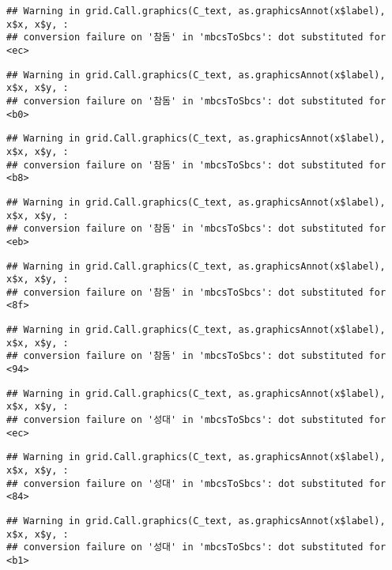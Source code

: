 \documentclass[
]{article}
\begin{document}
\begin{verbatim}
## Warning in grid.Call.graphics(C_text, as.graphicsAnnot(x$label), x$x, x$y, :
## conversion failure on '참돔' in 'mbcsToSbcs': dot substituted for <ec>
\end{verbatim}

\begin{verbatim}
## Warning in grid.Call.graphics(C_text, as.graphicsAnnot(x$label), x$x, x$y, :
## conversion failure on '참돔' in 'mbcsToSbcs': dot substituted for <b0>
\end{verbatim}

\begin{verbatim}
## Warning in grid.Call.graphics(C_text, as.graphicsAnnot(x$label), x$x, x$y, :
## conversion failure on '참돔' in 'mbcsToSbcs': dot substituted for <b8>
\end{verbatim}

\begin{verbatim}
## Warning in grid.Call.graphics(C_text, as.graphicsAnnot(x$label), x$x, x$y, :
## conversion failure on '참돔' in 'mbcsToSbcs': dot substituted for <eb>
\end{verbatim}

\begin{verbatim}
## Warning in grid.Call.graphics(C_text, as.graphicsAnnot(x$label), x$x, x$y, :
## conversion failure on '참돔' in 'mbcsToSbcs': dot substituted for <8f>
\end{verbatim}

\begin{verbatim}
## Warning in grid.Call.graphics(C_text, as.graphicsAnnot(x$label), x$x, x$y, :
## conversion failure on '참돔' in 'mbcsToSbcs': dot substituted for <94>
\end{verbatim}

\begin{verbatim}
## Warning in grid.Call.graphics(C_text, as.graphicsAnnot(x$label), x$x, x$y, :
## conversion failure on '성대' in 'mbcsToSbcs': dot substituted for <ec>
\end{verbatim}

\begin{verbatim}
## Warning in grid.Call.graphics(C_text, as.graphicsAnnot(x$label), x$x, x$y, :
## conversion failure on '성대' in 'mbcsToSbcs': dot substituted for <84>
\end{verbatim}

\begin{verbatim}
## Warning in grid.Call.graphics(C_text, as.graphicsAnnot(x$label), x$x, x$y, :
## conversion failure on '성대' in 'mbcsToSbcs': dot substituted for <b1>
\end{verbatim}
\end{document}
